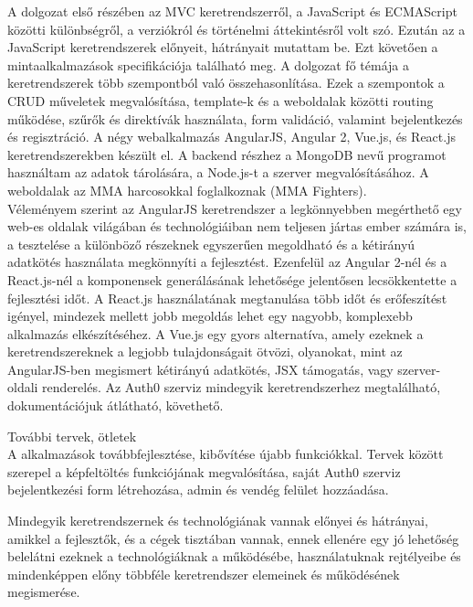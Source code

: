 
A dolgozat első részében az MVC keretrendszerről, a JavaScript és ECMAScript közötti különbségről, a verziókról és történelmi áttekintésről volt szó. Ezután az a JavaScript keretrendszerek előnyeit, hátrányait mutattam be. Ezt követően a mintaalkalmazások specifikációja található meg.
A dolgozat fő témája a keretrendszerek több szempontból való összehasonlítása. Ezek a szempontok a CRUD műveletek megvalósítása, template-k és a weboldalak közötti routing működése, szűrők és direktívák használata, form validáció, valamint bejelentkezés és regisztráció. 
A négy webalkalmazás AngularJS, Angular 2, Vue.js, és React.js keretrendszerekben készült el. A backend részhez a MongoDB nevű programot használtam az adatok tárolására, a Node.js-t a szerver megvalósításához. A weboldalak az MMA harcosokkal foglalkoznak (MMA Fighters).
\\Véleményem szerint az AngularJS keretrendszer a legkönnyebben megérthető egy web-es oldalak világában és technológiáiban nem teljesen jártas ember számára is, a tesztelése a különböző részeknek egyszerűen megoldható és a kétirányú adatkötés használata megkönnyíti a fejlesztést. Ezenfelül az Angular 2-nél és a React.js-nél a komponensek generálásának lehetősége jelentősen lecsökkentette a fejlesztési időt. A React.js használatának megtanulása több időt és erőfeszítést igényel, mindezek mellett jobb megoldás lehet egy nagyobb, komplexebb alkalmazás elkészítéséhez. A Vue.js egy gyors alternatíva, amely ezeknek a keretrendszereknek a legjobb tulajdonságait ötvözi, olyanokat, mint az AngularJS-ben megismert kétirányú adatkötés, JSX támogatás, vagy szerver-oldali renderelés.
Az Auth0 szerviz mindegyik keretrendszerhez megtalálható, dokumentációjuk átlátható, követhető. 


További tervek, ötletek \\
A alkalmazások továbbfejlesztése, kibővítése újabb funkciókkal. Tervek között szerepel a képfeltöltés funkciójának megvalósítása, saját Auth0 szerviz bejelentkezési form létrehozása, admin és vendég felület hozzáadása.

Mindegyik keretrendszernek és technológiának vannak előnyei és hátrányai, amikkel a fejlesztők, és a cégek tisztában vannak, ennek ellenére egy jó lehetőség belelátni ezeknek a technológiáknak a működésébe, használatuknak rejtélyeibe és mindenképpen előny többféle keretrendszer elemeinek és működésének megismerése.
